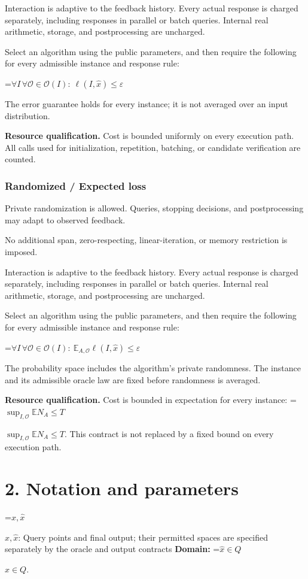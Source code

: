 \documentclass[10pt,a4paper]{article}
\newcommand{\AtlasMath}[1]{\par\begingroup\centering\setbox0=\hbox{$\displaystyle #1$}\ifdim\wd0>1.4\linewidth\typeout{ATLAS WIDE FORMULA: \the\wd0}\fi\ifdim\wd0>\linewidth\resizebox{\linewidth}{!}{\box0}\else\box0\fi\par\endgroup}
\newcommand{\AtlasInlineMath}[1]{\begingroup\setbox0=\hbox{$#1$}\ifdim\wd0>.4\linewidth\endgroup\AtlasMath{#1}\else\endgroup$#1$\fi}
\begin{document}
Interaction is adaptive to the feedback history. Every actual response is charged separately, including responses in parallel or batch queries. Internal real arithmetic, storage, and postprocessing are uncharged.

Select an algorithm using the public parameters, and then require the following for every admissible instance and response rule:


\AtlasMath{\forall I\,\forall\mathcal{O}\in\mathcal{O}(I):\ \ell(I,\widehat{x})\le\varepsilon}


The error guarantee holds for every instance; it is not averaged over an input distribution.

\textbf{Resource qualification.} Cost is bounded uniformly on every execution path. All calls used for initialization, repetition, batching, or candidate verification are counted.

\subsubsection{Randomized / Expected loss}
Private randomization is allowed. Queries, stopping decisions, and postprocessing may adapt to observed feedback.

No additional span, zero-respecting, linear-iteration, or memory restriction is imposed.

Interaction is adaptive to the feedback history. Every actual response is charged separately, including responses in parallel or batch queries. Internal real arithmetic, storage, and postprocessing are uncharged.

Select an algorithm using the public parameters, and then require the following for every admissible instance and response rule:


\AtlasMath{\forall I\,\forall\mathcal{O}\in\mathcal{O}(I):\ \mathbb{E}_{A,\mathcal{O}}\ell(I,\widehat{x})\le\varepsilon}


The probability space includes the algorithm's private randomness. The instance and its admissible oracle law are fixed before randomness is averaged.

\textbf{Resource qualification.} Cost is bounded in expectation for every instance: \AtlasInlineMath{\sup_{I,\mathcal O}\mathbb E N_A\le T}. This contract is not replaced by a fixed bound on every execution path.

\section{2. Notation and parameters}
\AtlasInlineMath{x,\widehat{x}}: Query points and final output; their permitted spaces are specified separately by the oracle and output contracts \textbf{Domain:} \AtlasInlineMath{\widehat{x}\in Q}.
\end{document}
